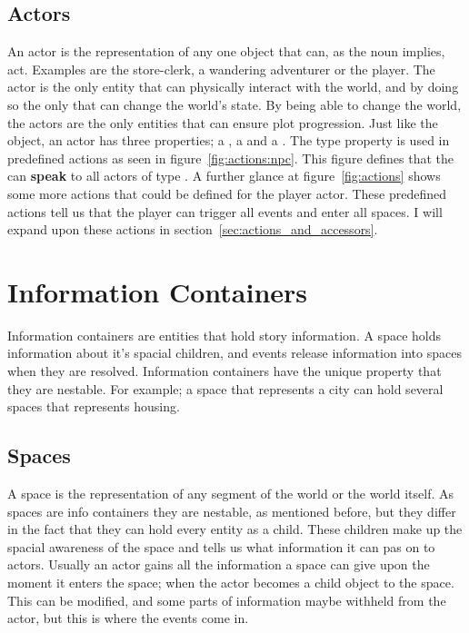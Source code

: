 \subsection{Actors}
\label{sec:actors}
An actor is the representation of any one object that can, as the noun implies, act. Examples are the store-clerk, a wandering adventurer or the player. The actor is the only entity that can physically interact with the world, and by doing so the only that can change the world's state. By being able to change the world, the actors are the only entities that can ensure plot progression. 
Just like the object, an actor has three properties; a , a  and a . The type property is used in predefined actions as seen in figure~\ref{fig:actions:npc}. This figure defines that the  can \textbf{speak} to all actors of type . A further glance at figure~\ref{fig:actions} shows some more actions that could be defined for the player actor. These predefined actions tell us that the player can trigger all events and enter all spaces. I will expand upon these actions in section~\ref{sec:actions_and_accessors}.

\section{Information Containers}
\label{sec:informationcontainers}
Information containers are entities that hold story information. A space holds information about it's spacial children, and events release information into spaces when they are resolved. Information containers have the unique property that they are nestable. For example; a space that represents a city can hold several spaces that represents housing. 

\subsection{Spaces}
A space is the representation of any segment of the world or the world itself. As spaces are info containers they are nestable, as mentioned before, but they differ in the fact that they can hold every entity as a child. These children make up the spacial awareness of the space and tells us what information it can pas on to actors. Usually an actor gains all the information a space can give upon the moment it enters the space; when the actor becomes a child object to the space. This can be modified, and some parts of information maybe withheld from the actor, but this is where the events come in.

